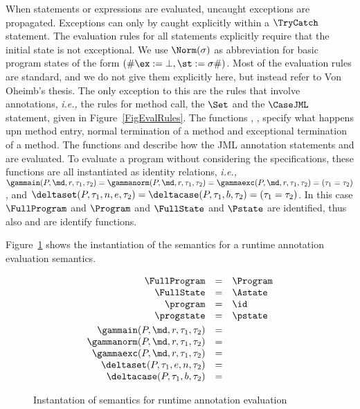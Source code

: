 When statements or expressions are evaluated, uncaught exceptions are
propagated. Exceptions can only by caught explicitly within a
\(\TryCatch\) statement. The evaluation rules for all statements
explicitly require that the initial state is not exceptional. We use
\(\Norm(\sigma)\) as abbreviation for basic program states of the form
\((\# \ex :=  \bot, \st := \sigma \#)\). Most of the evaluation rules
are standard, and we do not give them explicitly here, but instead
refer to Von Oheimb's thesis. The only exception to this are the rules
that involve annotations, \emph{i.e.,} the rules for method call, the
\(\Set\) and the \(\CaseJML\) statement, given in
Figure~\ref{FigEvalRules}. The functions \gammain, \gammanorm,
\gammaexc specify what happens upn method entry, normal termination
of a method and exceptional termination of a method. The functions
\deltaset and \deltacase describe how the JML annotation statements
\Set and \CaseJML are evaluated. To evaluate a program without
considering the specifications, these functions are all instantiated
as identity relations, \emph{i.e.,} \(\gammain(P, \md, r, \tau_1,
\tau_2) = \gammanorm(P, \md, r, \tau_1, \tau_2) = \gammaexc(P, \md, r,
\tau_1, \tau_2) = (\tau_1 = \tau_2)\), and \(\deltaset(P, \tau_1, n,
e, \tau_2) = \deltacase(P, \tau_1, b, \tau_2) = (\tau_1 =
\tau_2)\). In this case \(\FullProgram\) and \(\Program\) and
\(\FullState\) and \(\Pstate\) are identified, thus also \program and
\progstate are identify functions.

Figure~\ref{FigAnnotatedSem} shows the instantiation of the semantics
for a runtime annotation evaluation semantics.

\begin{figure}[t]
\[
\begin{array}{rcl}
\FullProgram & = & \Program\\
\FullState & = & \Astate\\
\program & = & \id\\
\progstate & = & \pstate\smallskip\\

\gammain(P, \md, r, \tau_1, \tau_2) & = & \\
\gammanorm(P, \md, r, \tau_1, \tau_2) & = & \\
\gammaexc(P, \md, r, \tau_1, \tau_2) & = & \\

\deltaset(P, \tau_1, e, n, \tau_2) & = & \\
\deltacase(P, \tau_1, b, \tau_2) & = & \\
\end{array}
\]
\caption{Instantation of semantics for runtime annotation evaluation}
\label{FigAnnotatedSem}
\end{figure}

